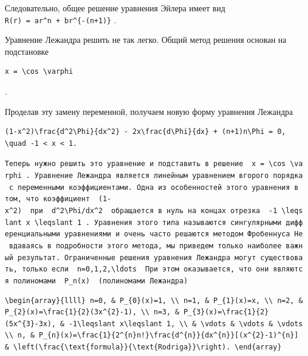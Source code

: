 \documentclass[
  ukrainian,
]{article}
\begin{document}
Следовательно, общее решение уравнения Эйлера имеет вид
\texttt{R(r)\ =\ ar\^{}n\ +\ br\^{}\{-(n+1)\}} .

Уравнение Лежандра решить не так легко. Общий метод решения основан на
подстановке

\begin{verbatim}
x = \cos \varphi
\end{verbatim}

.

Проделав эту замену переменной, получаем новую форму уравнения Лежандра

\begin{verbatim}
(1-x^2)\frac{d^2\Phi}{dx^2} - 2x\frac{d\Phi}{dx} + (n+1)n\Phi = 0, \quad -1 < x < 1.
\end{verbatim}

\texttt{Теперь\ нужно\ решить\ это\ уравнение\ и\ подставить\ в\ решение\ \ \textquotesingle{}x\ =\ \textbackslash{}cos\ \textbackslash{}varphi\textquotesingle{}\ .\ Уравнение\ Лежандра\ является\ линейным\ уравнением\ вгорого\ порядка\ с\ переменными\ коэффициентами.\ Одна\ из\ особенностей\ этого\ уравнения\ в\ том,\ что\ коэффициент\ \ \textquotesingle{}(1-x\^{}2)\textquotesingle{}\ \ при\ \ \textquotesingle{}d\^{}2\textbackslash{}Phi/dx\^{}2\textquotesingle{}\ \ обращается\ в\ нуль\ на\ концах\ отрезка\ \ \textquotesingle{}-1\ \textbackslash{}leqslant\ x\ \textbackslash{}leqslant\ 1\textquotesingle{}\ .\ Уравнения\ этого\ типа\ называются\ сингулярными\ дифференциальными\ уравнениями\ и\ очень\ часто\ решаются\ методом\ Фробеннуса\ Не\ вдаваясь\ в\ подробности\ этого\ метода,\ мы\ приведем\ только\ наиболее\ важный\ результат.\ Ограниченные\ решения\ уравнения\ Лежандра\ могут\ существовать,\ только\ если\ \ \textquotesingle{}n=0,1,2,\textbackslash{}ldots\textquotesingle{}\ \ При\ этом\ оказывается,\ что\ они\ являются\ полиномами\ \ \textquotesingle{}P\_n(x)\textquotesingle{}\ \ (полиномами\ Лежандра)}

\begin{verbatim}
\begin{array}{llll} n=0, & P_{0}(x)=1, \\ n=1, & P_{1}(x)=x, \\ n=2, & P_{2}(x)=\frac{1}{2}(3x^{2}-1), \\ n=3, & P_{3}(x)=\frac{1}{2}(5x^{3}-3x), & -1\leqslant x\leqslant 1, \\ & \vdots & \vdots & \vdots \\ n, & P_{n}(x)=\frac{1}{2^{n}n!}\frac{d^{n}}{dx^{n}}[(x^{2}-1)^{n}] & \left(\frac{\text{formula}}{\text{Rodriga}}\right). \end{array}
\end{verbatim}
\end{document}
